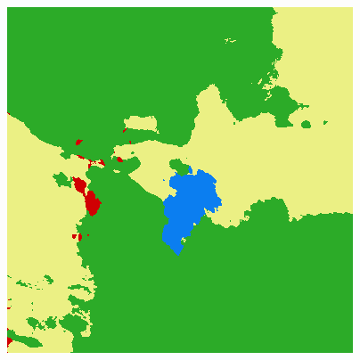 \begin{figure}
    \includegraphics[width=\UnetPredictionsImageWidth]{images/unet/unet-23D/114975-prediction}


\end{figure}
